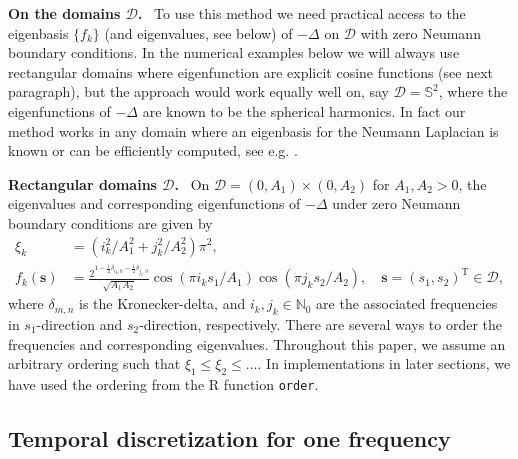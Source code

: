 \documentclass[12pt]{article} %
\begin{document}
\noindent\textbf{On the domains $\mathcal D$.} \ To use this method we need practical access to the eigenbasis $\{f_k\}$ (and eigenvalues, see below) of $-\Delta$ on $\mathcal D$ with zero Neumann boundary conditions.
In the numerical examples below we will always use 
rectangular domains where eigenfunction are explicit cosine functions (see next paragraph), but the approach would work equally well on, say $\mathcal{D}=\mathbb{S}^2$, where the eigenfunctions of $-\Delta$ are known to be the spherical harmonics.  In fact our method works in any domain where an eigenbasis for the Neumann Laplacian is known or can be efficiently computed, see e.g. \cite{KuSi84,SuZh17}.\medskip

\noindent\textbf{Rectangular domains $\mathcal D$.} \ On $\mathcal D=(0, A_1)\times (0, A_2)$ for $A_1, A_2>0$, the eigenvalues and corresponding eigenfunctions of $-\Delta$ under zero Neumann boundary conditions are given by
\begin{align}
\xi_{k} &= (i_k^2/A_1^2+j_k^2/A_2^2)\pi^2,\nonumber\\[0.2cm]
\label{eq:rectangle-eigenfunctions}
f_{k}(\boldsymbol{s}) &= \frac{2^{1 - \frac12\delta_{i_k,0} - \frac12\delta_{j_k,0}}}%
{\sqrt{A_1 A_2}}\cos(\pi i_k s_1/A_1) \cos(\pi j_k s_2/A_2), \quad \boldsymbol{s}=(s_1,s_2)^\mathrm{T}\in\mathcal{D},
\end{align}
where $\delta_{m,n}$ is the Kronecker-delta, %
and 
 $i_k,j_k\in\mathbb N_0$  %
are the associated frequencies in $s_1$-direction and $s_2$-direction, respectively. %
There are several ways to order the frequencies and corresponding eigenvalues. Throughout this paper, we assume an arbitrary ordering %
such that
$\xi_1 \leq \xi_2 \leq \ldots$.
In implementations in later sections, we have used the ordering from the \textsf{R} function \texttt{order}.
%


\subsection{Temporal discretization for one frequency}
\label{sec:disc:time}
\end{document}
